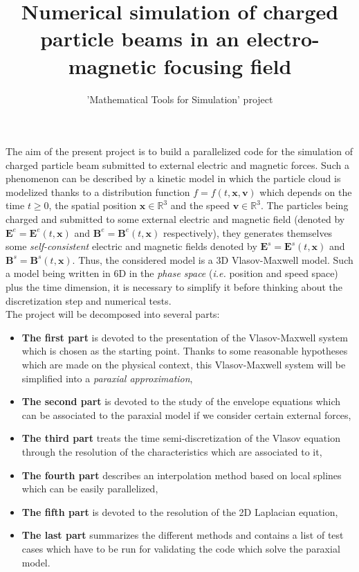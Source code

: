 \documentclass[10pt]{article}
\title{Numerical simulation of charged particle beams in an electro-magnetic focusing field}
\author{'Mathematical Tools for Simulation' project}
\date{}
\newcommand{\R}{{\mathbb R}}
\begin{document}
\maketitle

The aim of the present project is to build a parallelized code for the simulation of charged particle beam submitted to external electric and magnetic forces. Such a phenomenon can be described by a kinetic model in which the particle cloud is modelized thanks to a distribution function $f = f(t,\mathbf{x},\mathbf{v})$ which depends on the time $t \geq 0$, the spatial position $\mathbf{x} \in \R^{3}$ and the speed $\mathbf{v} \in \R^{3}$. The particles being charged and submitted to some external electric and magnetic field (denoted by $\mathbf{E}^{e} = \mathbf{E}^{e}(t,\mathbf{x})$ and $\mathbf{B}^{e} = \mathbf{B}^{e}(t,\mathbf{x})$ respectively), they generates themselves some \textit{self-consistent} electric and magnetic fields denoted by $\mathbf{E}^{s}=\mathbf{E}^{s}(t,\mathbf{x})$ and $\mathbf{B}^{s}=\mathbf{B}^{s}(t,\mathbf{x})$. Thus, the considered model is a 3D Vlasov-Maxwell model. Such a model being written in 6D in the \textit{phase space} (\textit{i.e.} position and speed space) plus the time dimension, it is necessary to simplify it before thinking about the discretization step and numerical tests. \\

\indent The project will be decomposed into several parts: \\
\begin{itemize}
\item \textbf{The first part} is devoted to the presentation of the Vlasov-Maxwell system which is chosen as the starting point. Thanks to some reasonable hypotheses which are made on the physical context, this Vlasov-Maxwell system will be simplified into a \textit{paraxial approximation},
\item \textbf{The second part} is devoted to the study of the envelope equations which can be associated to the paraxial model if we consider certain external forces,
\item \textbf{The third part} treats the time semi-discretization of the Vlasov equation through the resolution of the characteristics which are associated to it,
\item \textbf{The fourth part} describes an interpolation method based on local splines which can be easily parallelized,
\item \textbf{The fifth part} is devoted to the resolution of the 2D Laplacian equation,
\item \textbf{The last part} summarizes the different methods and contains a list of test cases which have to be run for validating the code which solve the paraxial model.
\end{itemize}
\end{document}
